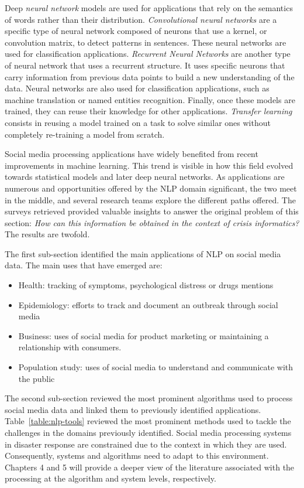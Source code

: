 Deep \emph{neural network} models are used for applications that rely on the semantics of words rather than their distribution.
\emph{Convolutional neural networks} are a specific type of neural network composed of neurons that use a kernel, or convolution matrix, to detect patterns in sentences.
These neural networks are used for classification applications.
\emph{Recurrent Neural Networks} are another type of neural network that uses a recurrent structure.
It uses specific neurons that carry information from previous data points to build a new understanding of the data.
Neural networks are also used for classification applications, such as machine translation or named entities recognition.
Finally, once these models are trained, they can reuse their knowledge for other applications.
\emph{Transfer learning} consists in reusing a model trained on a task to solve similar ones without completely re-training a model from scratch.

Social media processing applications have widely benefited from recent improvements in machine learning.
This trend is visible in how this field evolved towards statistical models and later deep neural networks.
As applications are numerous and opportunities offered by the NLP domain significant, the two meet in the middle, and several research teams explore the different paths offered.
The surveys retrieved provided valuable insights to answer the original problem of this section: \emph{How can this information be obtained in the context of crisis informatics?}
The results are twofold.

The first sub-section identified the main applications of NLP on social media data.
The main uses that have emerged are:

\begin{itemize}
    \item Health: tracking of symptoms, psychological distress or drugs mentions
    \item Epidemiology: efforts to track and document an outbreak through social media
    \item Business: uses of social media for product marketing or maintaining a relationship with consumers.
    \item Population study: uses of social media to understand and communicate with the public
\end{itemize}

The second sub-section reviewed the most prominent algorithms used to process social media data and linked them to previously identified applications.
Table~\ref{table:nlp-tools} reviewed the most prominent methods used to tackle the challenges in the domains previously identified.
Social media processing systems in disaster response are constrained due to the context in which they are used.
Consequently, systems and algorithms need to adapt to this environment.
Chapters 4 and 5 will provide a deeper view of the literature associated with the processing at the algorithm and system levels, respectively.

